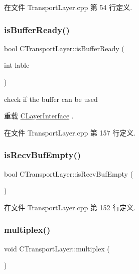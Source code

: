 在文件 Transport\+Layer.\+cpp 第 54 行定义.

\mbox{\label{class_c_transport_layer_aace17995c3cff74c756ecdb2a2e8cf43}} 
\subsubsection{\texorpdfstring{is\+Buffer\+Ready()}{isBufferReady()}}
{\footnotesize\ttfamily bool C\+Transport\+Layer\+::is\+Buffer\+Ready (\begin{DoxyParamCaption}\item[{int}]{lable }\end{DoxyParamCaption})\hspace{0.3cm}{\ttfamily [virtual]}}

check if the buffer can be used 

重载 \hyperlink{class_c_layer_interface_a4979d7b5740c06be048e4b0f1195c8fc}{C\+Layer\+Interface} .



在文件 Transport\+Layer.\+cpp 第 157 行定义.

\mbox{\label{class_c_transport_layer_a18cba0784dba2a15f051be2c1163c278}} 
\subsubsection{\texorpdfstring{is\+Recv\+Buf\+Empty()}{isRecvBufEmpty()}}
{\footnotesize\ttfamily bool C\+Transport\+Layer\+::is\+Recv\+Buf\+Empty (\begin{DoxyParamCaption}{ }\end{DoxyParamCaption})}



在文件 Transport\+Layer.\+cpp 第 152 行定义.

\mbox{\label{class_c_transport_layer_abce8f3ca4b9c4d5c957b0f7b6746f289}} 
\subsubsection{\texorpdfstring{multiplex()}{multiplex()}\hspace{0.1cm}{\footnotesize\ttfamily [1/2]}}
{\footnotesize\ttfamily void C\+Transport\+Layer\+::multiplex (\begin{DoxyParamCaption}{ }\end{DoxyParamCaption})}



